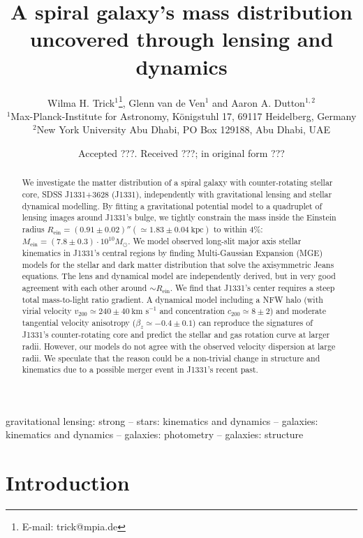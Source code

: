 \documentclass[useAMS,usenatbib]{mnras}
\title[A spiral galaxy's mass distribution uncovered]{A spiral galaxy's mass distribution uncovered through lensing and dynamics}
\author[W.H. Trick, G. van de Ven and A.A. Dutton]{Wilma H. Trick$^{1}$\thanks{E-mail: trick@mpia.de}, Glenn van de Ven$^{1}$ and Aaron A. Dutton$^{1,2}$\\
$^{1}$Max-Planck-Institute for Astronomy, K\"{o}nigstuhl 17, 69117 Heidelberg, Germany\\
$^{2}$New York University Abu Dhabi, PO Box 129188, Abu Dhabi, UAE\\}
\begin{document}
\date{Accepted ???. Received ???; in original form ???}

\pagerange{\pageref{firstpage}--\pageref{lastpage}} 

\maketitle

\label{firstpage}

\begin{abstract}
We investigate the matter distribution of a spiral galaxy with counter-rotating stellar core, SDSS J1331+3628 (J1331), independently with gravitational lensing and stellar dynamical modelling. By fitting a gravitational potential model to a quadruplet of lensing images around J1331's bulge, we tightly constrain the mass inside the Einstein radius $R_\text{ein}=(0.91\pm0.02)''(\simeq1.83\pm0.04~\text{kpc})$ to within 4\%: $M_\text{ein} = (7.8\pm0.3) \cdot 10^{10} M_\odot$. We model observed long-slit major axis stellar kinematics in J1331's central regions by finding Multi-Gaussian Expansion (MGE) models for the stellar and dark matter distribution that solve the axisymmetric Jeans equations. The lens and dynamical model are independently derived, but in very good agreement with each other around $\sim R_\text{ein}$. We find that J1331's center requires a steep total mass-to-light ratio gradient. A dynamical model including a NFW halo (with virial velocity $v_{200} \simeq 240 \pm 40~\text{km s}^{-1}$ and concentration $c_{200} \simeq 8 \pm 2$) and moderate tangential velocity anisotropy ($\beta_z \simeq -0.4 \pm 0.1$) can reproduce the signatures of J1331's counter-rotating core and predict the stellar and gas rotation curve at larger radii. However, our models do not agree with the observed velocity dispersion at large radii. We speculate that the reason could be a non-trivial change in structure and kinematics due to a possible merger event in J1331's recent past.
\end{abstract}

\begin{keywords}
gravitational lensing: strong -- stars: kinematics and dynamics -- galaxies: kinematics and dynamics -- galaxies: photometry -- galaxies: structure
\end{keywords}

\section{Introduction} \label{sec:intro}
\end{document}
